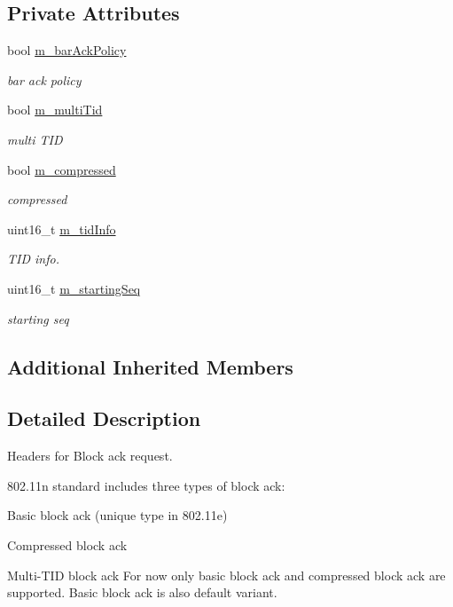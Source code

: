 \subsection*{Private Attributes}
\begin{DoxyCompactItemize}
\item 
bool \hyperlink{classns3_1_1CtrlBAckRequestHeader_a44e3acf5aeeb6331ae47a63456e9bea9}{m\+\_\+bar\+Ack\+Policy}
\begin{DoxyCompactList}\small\item\em bar ack policy \end{DoxyCompactList}\item 
bool \hyperlink{classns3_1_1CtrlBAckRequestHeader_abc49ee1894e62986dcbcf98af884a794}{m\+\_\+multi\+Tid}
\begin{DoxyCompactList}\small\item\em multi T\+ID \end{DoxyCompactList}\item 
bool \hyperlink{classns3_1_1CtrlBAckRequestHeader_ad4f7ec69067c22a0008aaf4ed8dac81c}{m\+\_\+compressed}
\begin{DoxyCompactList}\small\item\em compressed \end{DoxyCompactList}\item 
uint16\+\_\+t \hyperlink{classns3_1_1CtrlBAckRequestHeader_a4ccda262169f8e459a1bd1bcff6ebb45}{m\+\_\+tid\+Info}
\begin{DoxyCompactList}\small\item\em T\+ID info. \end{DoxyCompactList}\item 
uint16\+\_\+t \hyperlink{classns3_1_1CtrlBAckRequestHeader_a448a8dddb080c2b36573f5c39a8fe105}{m\+\_\+starting\+Seq}
\begin{DoxyCompactList}\small\item\em starting seq \end{DoxyCompactList}\end{DoxyCompactItemize}
\subsection*{Additional Inherited Members}


\subsection{Detailed Description}
Headers for Block ack request. 

802.\+11n standard includes three types of block ack\+:
\begin{DoxyItemize}
\item Basic block ack (unique type in 802.\+11e)
\item Compressed block ack
\item Multi-\/\+T\+ID block ack For now only basic block ack and compressed block ack are supported. Basic block ack is also default variant. 
\end{DoxyItemize}

